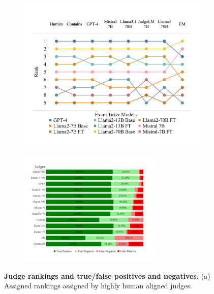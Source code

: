 \begin{figure}[t]
    \centering
    \begin{subfigure}[b]{0.46\textwidth}
        \centering
        \includegraphics[width=\linewidth]{figures/Rankings_HG.pdf}
        \vspace{-8mm}
        \caption{}
        \vspace{-2mm}
        \label{fig:rankcorrelation}
    \end{subfigure}
    \hfill
    \begin{subfigure}[b]{0.53\textwidth}
        \centering
        \includegraphics[width=\linewidth, height=5.5cm]{figures/ConfusionMatrixV5.pdf}
        \vspace{-8mm}
        \caption{}
        \vspace{-2mm}
        \label{fig:confusionmatrix}
    \end{subfigure}
    \caption{\textbf{Judge rankings and true/false positives and negatives.} 
    (a) Assigned \evaluatormodel rankings assigned by highly human aligned judges.
}
\end{figure}
